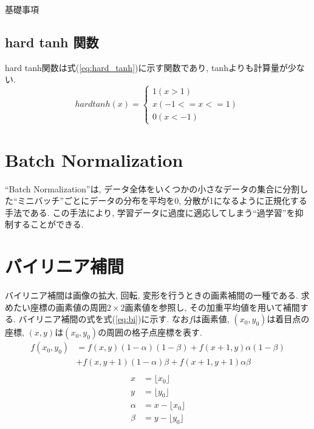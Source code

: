 \begin{chapter}{基礎事項}
\subsection*{hard tanh 関数}
hard tanh関数は式(\ref{eq:hard_tanh})に示す関数であり, tanhよりも計算量が少ない. 
\begin{equation}
  hard tanh(x) = 
      \begin{cases}
        1  (x>1)\\ 
        x  (-1<=x<=1)\\
        0  (x<-1) \label{eq:hard_tanh}
      \end{cases}
\end{equation}

\section{Batch Normalization}\label{hu:bn}
``Batch Normalization''\cite{batchnorm}は, データ全体をいくつかの小さなデータの集合に分割した``ミニバッチ''ごとにデータの分布を平均を0, 分散が1になるように正規化する手法である. この手法により, 学習データに過度に適応してしまう``過学習''を抑制することができる.
\section{バイリニア補間}\label{hu:bi}
バイリニア補間は画像の拡大, 回転, 変形を行うときの画素補間の一種である. 求めたい座標の画素値の周囲$2\times2$画素値を参照し, その加重平均値を用いて補間する. バイリニア補間の式を式(\ref{eq:bi})に示す. なお$f$は画素値, $(x_0, y_0)$は着目点の座標, $(x, y)$は$(x_0, y_0)$の周囲の格子点座標を表す.
\begin{equation}
  \begin{split}
  f(x_0, y_0) &= f(x, y)(1-\alpha)(1-\beta)+f(x+1, y)\alpha(1-\beta)\\
  &+ f(x, y+1)(1-\alpha)\beta+f(x+1, y+1)\alpha\beta\\ \label{eq:bi}
  \end{split}
\end{equation}
\begin{equation}
  \begin{split}
  x &= \lfloor x_0 \rfloor  \nonumber\\
  y &= \lfloor y_0 \rfloor \nonumber\\
  \alpha &= x - \lfloor x_0 \rfloor  \nonumber\\
  \beta &= y -\lfloor y_0 \rfloor  \nonumber
  \end{split}
\end{equation}
 

\end{chapter}
